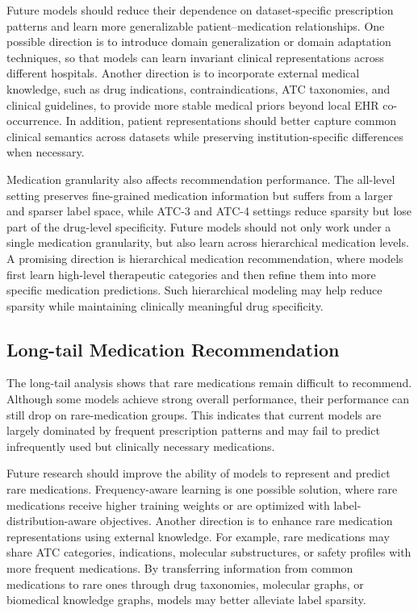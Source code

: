 \documentclass[manuscript,review]{acmart}
\begin{document}
Future models should reduce their dependence on dataset-specific prescription patterns and learn more generalizable patient--medication relationships. One possible direction is to introduce domain generalization or domain adaptation techniques, so that models can learn invariant clinical representations across different hospitals. Another direction is to incorporate external medical knowledge, such as drug indications, contraindications, ATC taxonomies, and clinical guidelines, to provide more stable medical priors beyond local EHR co-occurrence. In addition, patient representations should better capture common clinical semantics across datasets while preserving institution-specific differences when necessary.

Medication granularity also affects recommendation performance. The all-level setting preserves fine-grained medication information but suffers from a larger and sparser label space, while ATC-3 and ATC-4 settings reduce sparsity but lose part of the drug-level specificity. Future models should not only work under a single medication granularity, but also learn across hierarchical medication levels. A promising direction is hierarchical medication recommendation, where models first learn high-level therapeutic categories and then refine them into more specific medication predictions. Such hierarchical modeling may help reduce sparsity while maintaining clinically meaningful drug specificity.

\subsection{Long-tail Medication Recommendation}

The long-tail analysis shows that rare medications remain difficult to recommend. Although some models achieve strong overall performance, their performance can still drop on rare-medication groups. This indicates that current models are largely dominated by frequent prescription patterns and may fail to predict infrequently used but clinically necessary medications.

Future research should improve the ability of models to represent and predict rare medications. Frequency-aware learning is one possible solution, where rare medications receive higher training weights or are optimized with label-distribution-aware objectives. Another direction is to enhance rare medication representations using external knowledge. For example, rare medications may share ATC categories, indications, molecular substructures, or safety profiles with more frequent medications. By transferring information from common medications to rare ones through drug taxonomies, molecular graphs, or biomedical knowledge graphs, models may better alleviate label sparsity.
\end{document}
